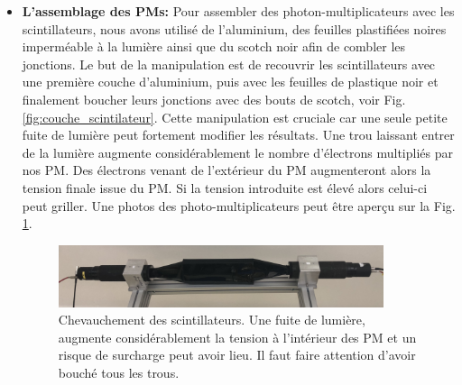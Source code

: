 \documentclass[12pt]{article}
\begin{document}
\begin{itemize}
    \item \textbf{L'assemblage des PMs: } Pour assembler des photon-multiplicateurs avec les scintillateurs, nous avons utilisé de l'aluminium, des feuilles plastifiées noires imperméable à la lumière ainsi que du scotch noir afin de combler les jonctions. Le but de la manipulation est de recouvrir les scintillateurs avec une première couche d'aluminium, puis avec les feuilles de plastique noir et finalement boucher leurs jonctions avec des bouts de scotch, voir Fig. \ref{fig:couche_scintilateur}. Cette manipulation est cruciale car une seule petite fuite de lumière peut fortement modifier les résultats. Une trou laissant entrer de la lumière augmente considérablement le nombre d'électrons multipliés par nos PM. Des électrons venant de l'extérieur du PM augmenteront alors la tension finale issue du PM. Si la tension introduite est élevé alors celui-ci peut griller. Une photos des photo-multiplicateurs peut être aperçu sur la Fig. \ref{fig:PMS_photo}.
    
    \begin{figure}[htpb!]
        \centering
        \includegraphics[width=0.9\textwidth]{Images/Photos/PM_photo.jpg}
        \caption{Chevauchement des scintillateurs. Une fuite de lumière, augmente considérablement la tension à l'intérieur des PM et un risque de surcharge peut avoir lieu. Il faut faire attention d'avoir bouché tous les trous.}
        \label{fig:PMS_photo}
    \end{figure}


\end{itemize}
\end{document}
